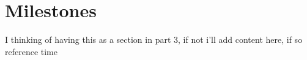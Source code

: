 
\chapter{Milestones} %

\label{Part9Chapter5} %


I thinking of having this as a section in part 3, if not i'll add content here, if so reference time